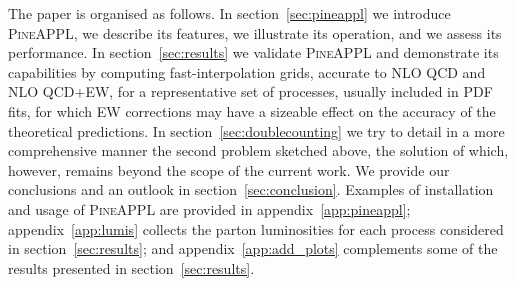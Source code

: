 The paper is organised as follows. In section~\ref{sec:pineappl} we introduce
\textsc{PineAPPL}, we describe its features, we illustrate its operation, and we
assess its performance. In section~\ref{sec:results} we validate
\textsc{PineAPPL} and demonstrate its capabilities by computing fast-interpolation grids, accurate to NLO QCD and NLO QCD+EW, for a representative
set of processes, usually included in PDF fits, for which EW corrections may
have a sizeable effect on the accuracy of the theoretical predictions.
In section~\ref{sec:doublecounting} we try to detail in a more
comprehensive manner the second problem sketched above, the solution of which,
however, remains beyond the scope of the current work. We provide our
conclusions and an outlook in section~\ref{sec:conclusion}. Examples of
installation and usage of \textsc{PineAPPL} are provided in
appendix~\ref{app:pineappl}; appendix~\ref{app:lumis} collects the parton
luminosities for each process considered in section~\ref{sec:results}; and
appendix~\ref{app:add_plots} complements some of the results presented
in section~\ref{sec:results}.

